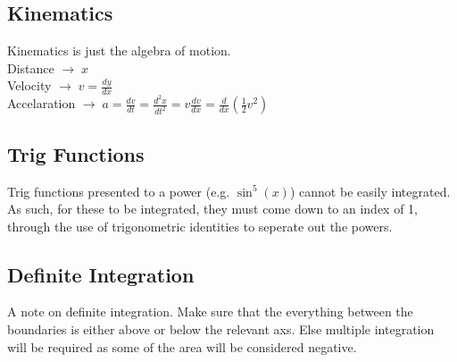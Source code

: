 \documentclass[a5paper]{article}
\begin{document}
	\subsection{Kinematics}
	Kinematics is just the algebra of motion.\\
	Distance $\to\;x$\\
	Velocity $\to\;v=\frac{dy}{dx}$\\
	Accelaration $\to\;a=\frac{dv}{dt}=\frac{d^{2}x}{dt^{2}}=v\frac{dv}{dx}=\frac{d}{dx}(\frac{1}{2}v^{2})$

	\subsection{Trig Functions}
	Trig functions presented to a power (e.g. $\sin^{5}{(x)}$) cannot be easily integrated. As such, for these to be integrated, they must come down to an index of 1, through the use of trigonometric identities to seperate out the powers.
	
	\subsection{Definite Integration}
	\raggedright
	\break\break
	A note on definite integration. Make sure that the everything between the boundaries is either above or below the relevant axs. Else multiple integration will be required as some of the area will be considered negative.
\end{document}
